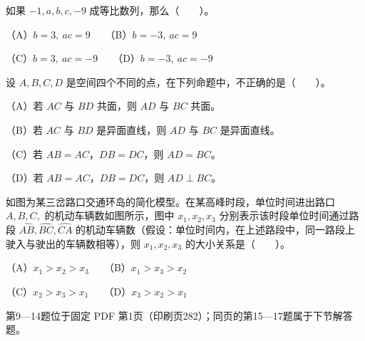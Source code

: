 \begin{question}
如果 $-1,a,b,c,-9$ 成等比数列，那么\mbox{（　　）}。

（A）$b=3,\ ac=9$　　（B）$b=-3,\ ac=9$

（C）$b=3,\ ac=-9$　　（D）$b=-3,\ ac=-9$

\end{question}
\begin{question}
设 $A,B,C,D$ 是空间四个不同的点，在下列命题中，不正确的是\mbox{（　　）}。

（A）若 $AC$ 与 $BD$ 共面，则 $AD$ 与 $BC$ 共面。

（B）若 $AC$ 与 $BD$ 是异面直线，则 $AD$ 与 $BC$ 是异面直线。

（C）若 $AB=AC$，$DB=DC$，则 $AD=BC$。

（D）若 $AB=AC$，$DB=DC$，则 $AD\perp BC$。

\Needspace{0.4\textheight}
\end{question}
\begin{question}
如图为某三岔路口交通环岛的简化模型。在某高峰时段，单位时间进出路口 $A,B,C,$ 的机动车辆数如图所示，图中 $x_1,x_2,x_3$ 分别表示该时段单位时间通过路段 $\widehat{AB},\widehat{BC},\widehat{CA}$ 的机动车辆数（假设：单位时间内，在上述路段中，同一路段上驶入与驶出的车辆数相等），则 $x_1,x_2,x_3$ 的大小关系是\mbox{（　　）}。

（A）$x_1>x_2>x_3$　　（B）$x_1>x_3>x_2$

（C）$x_2>x_3>x_1$　　（D）$x_3>x_2>x_1$
\nopagebreak[4]
\begin{center}\end{center}
\nopagebreak[4]
\end{question}

\begin{gktip}
第9—14题位于固定 PDF 第1页（印刷页282）；同页的第15—17题属于下节解答题。
\end{gktip}


